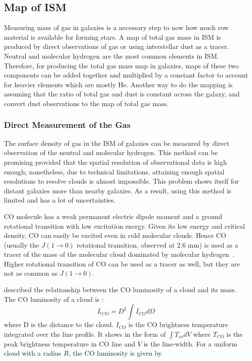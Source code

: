 \subsection{Map of ISM}
\label{sec: ismmap}
Measuring mass of gas in galaxies is a necessary step to now how much row material is available for forming stars.
A map of total gas mass in ISM is produced by direct observations of gas or using interstellar dust as a tracer. 
Neutral and molecular hydrogen are the most common elements in ISM. 
Therefore, for producing the total gas mass map in galaxies, maps of these two components can be added together and multiplied by a constant factor to account for heavier elements which are mostly He. 
Another way to do the mapping is assuming that the ratio of total gas and dust is constant across the galaxy, and convert dust observations to the map of total gas mass.

\subsubsection{Direct Measurement of the Gas}

The surface density of gas in the ISM of galaxies can be measured by direct observation of the neutral and molecular hydrogen.
This method can be promising provided that the spatial resolution of observational data is high enough; nonetheless, due to technical limitations, attaining enough spatial resolutions to resolve clouds is almost impossible. This problem shows itself for distant galaxies more than nearby galaxies. 
As a result, using this method is limited and has a lot of uncertainties. 
 

CO molecule has a weak permanent electric dipole moment and a ground rotational transition with low excitation energy. 
Given its low energy and critical density, CO can easily be excited even in cold molecular clouds.
Hence CO (usually the $J(1\rightarrow 0)$ rotational transition, observed at 2.6 mm) is used as a tracer of the mass of the molecular cloud dominated by molecular hydrogen~\citep[e.g.][] {Sanders84}.
Higher rotational transition of CO can be used as a tracer as well, but they are not as common as $J(1\rightarrow 0)$.

\cite{Young91} described the relationship between the CO luminosity of a cloud and its mass. The CO luminosity of a cloud is :
\begin{equation}
L_{CO} = D^2 \int I_{CO} d\Omega 
\end{equation}
where D is the distance to the cloud. 
$I_{CO}$ is the CO brightness temperature integrated over the line profile.
It shows in the form of ${\int T_{co} dV}$ where $T_{CO}$ is the peak brightness temperature in CO line and $V$ is the line-width. 
For a uniform cloud with a radius $R$, the CO luminosity is given by

